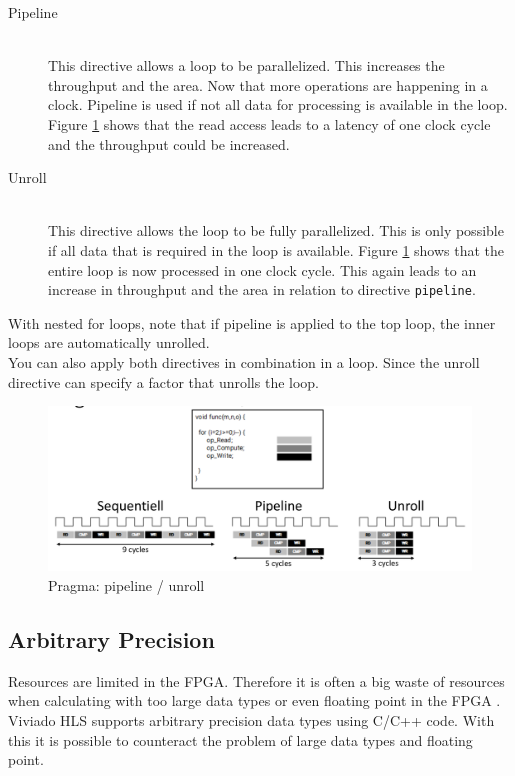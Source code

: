 \begin{description}
\item[Pipeline]\hfill \\
This directive allows a loop to be parallelized. This increases the throughput and the area. Now that more operations are happening in a clock.
Pipeline is used if not all data for processing is available in the loop. Figure \ref{fig:p_pipeline_unroll} shows that the read access leads to a latency of one clock cycle and the throughput could be increased.
\item[Unroll]\hfill \\ 
This directive allows the loop to be fully parallelized. This is only possible
if all data that is required in the loop is available. Figure 
\ref{fig:p_pipeline_unroll} shows that the entire loop is now processed in one
clock cycle. This again leads to an increase in throughput and the area in
relation to directive \texttt{pipeline}.
\end{description}

With nested for loops, note that if pipeline is applied to the top loop, the inner loops are automatically unrolled. \\
You can also apply both directives in combination in a loop. Since the unroll directive can specify a factor that unrolls the loop.


\begin{figure}[tb!]
    \centering
    \includegraphics[width=\textwidth]{images/theory/pipeline_unroll.png}
    \caption{Pragma: pipeline / unroll}
    \label{fig:p_pipeline_unroll}
\end{figure}

\subsection{Arbitrary Precision} \label{ch:ap}
Resources are limited in the FPGA. Therefore it is often a big waste of resources when calculating with too large data types or even floating point in the FPGA \cite{floating}. Viviado HLS supports arbitrary precision data types using C/C++ code. With this it is possible to counteract the problem of large data types and floating point. \\

